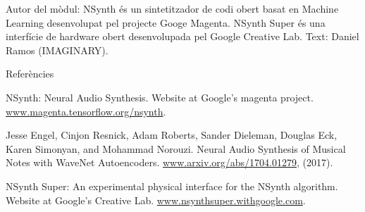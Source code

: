 Autor del mòdul: NSynth és un sintetitzador de codi obert basat en Machine Learning desenvolupat pel projecte Googe Magenta. NSynth Super és una interfície de hardware obert desenvolupada pel Google Creative Lab.
Text: Daniel Ramos (IMAGINARY).

Referències

NSynth: Neural Audio Synthesis. Website at Google's magenta project. \url{www.magenta.tensorflow.org/nsynth}.

Jesse Engel, Cinjon Resnick, Adam Roberts, Sander Dieleman, Douglas Eck, Karen Simonyan, and Mohammad Norouzi. Neural Audio Synthesis of Musical Notes with WaveNet Autoencoders. \url{www.arxiv.org/abs/1704.01279}, (2017).

NSynth Super: An experimental physical interface for the NSynth algorithm. Website at Google's Creative Lab. \url{www.nsynthsuper.withgoogle.com}.
